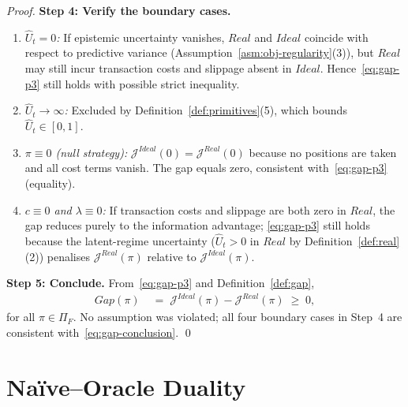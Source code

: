 \documentclass[12pt,openany]{book}
\numberwithin{equation}{chapter}
\theoremstyle{plain}
\theoremstyle{definition}
\theoremstyle{remark}
\numberwithin{equation}{chapter}
\theoremstyle{plain}
\newcommand{\Ideal}{\mathcal{E}_{I}}
\newcommand{\Real}{\mathcal{E}_{R}}
\newcommand{\Gap}{\mathcal{G}}
\def\Ideal{Ideal}%
\def\Real{Real}%
\def\Gap{Gap}%
\begin{document}
\begin{proof}
\medskip
\noindent\textbf{Step 4: Verify the boundary cases.}
\begin{enumerate}
  \item \emph{$\hat{U}_t = 0$:}  If epistemic uncertainty
        vanishes, $\Real$ and $\Ideal$ coincide with respect
        to predictive variance (Assumption~\ref{asm:obj-regularity}(3)),
        but $\Real$ may still incur transaction costs and slippage
        absent in $\Ideal$.  Hence~\eqref{eq:gap-p3} still holds
        with possible strict inequality.
  \item \emph{$\hat{U}_t \to \infty$:}  Excluded by
        Definition~\ref{def:primitives}(5), which bounds
        $\hat{U}_t \in [0,1]$.
  \item \emph{$\pi \equiv 0$ (null strategy):}
        $\mathcal{J}^{\Ideal}(0) = \mathcal{J}^{\Real}(0)$
        because no positions are taken and all cost terms
        vanish.  The gap equals zero, consistent
        with~\eqref{eq:gap-p3} (equality).
  \item \emph{$c \equiv 0$ and $\lambda \equiv 0$:}
        If transaction costs and slippage are both zero in
        $\Real$, the gap reduces purely to the information
        advantage; \eqref{eq:gap-p3} still holds because
        the latent-regime uncertainty
        ($\hat{U}_t > 0$ in $\Real$ by Definition~\ref{def:real}(2))
        penalises $\mathcal{J}^{\Real}(\pi)$ relative to
        $\mathcal{J}^{\Ideal}(\pi)$.
\end{enumerate}

\medskip
\noindent\textbf{Step 5: Conclude.}
From~\eqref{eq:gap-p3} and Definition~\ref{def:gap},
\begin{align}
  \Gap(\pi)
  &\;=\;
  \mathcal{J}^{\Ideal}(\pi) - \mathcal{J}^{\Real}(\pi)
  \;\geq\; 0,
  \label{eq:gap-conclusion}
\end{align}
for all $\pi \in \Pi_F$.  No assumption was violated; all four
boundary cases in Step~4 are consistent with~\eqref{eq:gap-conclusion}.
\qed
\end{proof}

\section{Na\"{i}ve--Oracle Duality}
\end{document}
